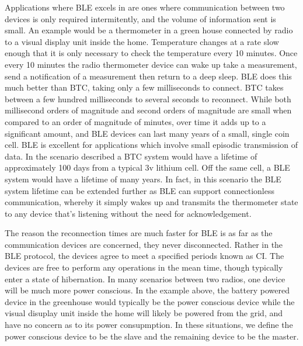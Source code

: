 \documentclass[]{article}
\begin{document}
Applications where \ac{BLE} excels in are ones where communication between two devices is only required intermitently, and the volume of information sent is small. An example would be a thermometer in a green house connected by radio to a visual display unit inside the home. Temperature changes at a rate slow enough that it is only necessary to check the temperature every 10 minutes. Once every 10 minutes the radio thermometer device can wake up take a measurement, send a notification of a measurement then return to a deep sleep. \ac{BLE} does this much better than \ac{BTC}, taking only a few milliseconds to connect. \ac{BTC} takes between a few hundred milliseconds to several seconds to reconnect. While both millisecond orders of magnitude and second orders of magnitude are small when compared to an order of magnitude of minutes, over time it adds up to a significant amount, and \ac{BLE} devices can last many years of a small, single coin cell. \ac{BLE} is excellent for applications which involve small episodic transmission of data. In the scenario described a \ac{BTC} system would have a lifetime of approximately 100 days from a typical 3v lithium cell. Off the same cell, a \ac{BLE} system would have a lifetime of many years. In fact, in this scenario the \ac{BLE} system lifetime can be extended further as \ac{BLE} can support connectionless communication, whereby it simply wakes up and transmits the thermometer state to any device that's listening without the need for acknowledgement.

The reason the reconnection times are much faster for \ac{BLE} is as far as the communication devices are concerned, they never disconnected. Rather in the \ac{BLE} protocol, the devices agree to meet a specified periods known as \ac{CI}. The devices are free to perform any operations in the mean time, though typically enter a state of hibernation. In many scenarios between two radios, one device will be much more power conscious. In the example above, the battery powered device in the greenhouse would typically be the power conscious device while the visual disuplay unit inside the home will likely be powered from the grid, and have no concern as to its power consupmption. In these situations, we define the power conscious device to be the slave and the remaining device to be the master. 
\end{document}
